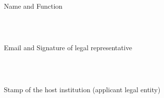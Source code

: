 \documentclass[a4paper,11pt,ngerman,numbers=noenddot]{scrreprt}
\begin{document}
\underline{\hspace{8.5cm}}\\
\begin{small}Name and Function\end{small}\\[1.1cm]


\underline{\hspace{8.5cm}}\\
\begin{small}Email and Signature of legal representative\end{small}\\[1.1cm]

\underline{\hspace{8.5cm}}\\
\begin{small}Stamp of the host institution (applicant legal entity)\end{small}
\end{document}
